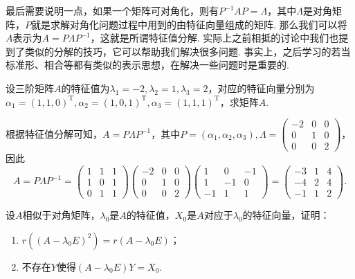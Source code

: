 最后需要说明一点，如果一个矩阵可对角化，则有$P^{-1}AP=\varLambda$，其中$\varLambda$是对角矩阵，$P$就是求解对角化问题过程中用到的由特征向量组成的矩阵. 那么我们可以将$A$表示为$A=P\varLambda P^{-1}$，这就是所谓特征值分解. 实际上之前相抵的讨论中我们也提到了类似的分解的技巧，它可以帮助我们解决很多问题. 事实上，之后学习的若当标准形、相合等都有类似的表示思想，在解决一些问题时是重要的.
\begin{example}{}{}
    设三阶矩阵$A$的特征值为$\lambda_1=-2,\lambda_2=1,\lambda_3=2$，对应的特征向量分别为$\alpha_1=(1,1,0)^\mathrm{T},\alpha_2=(1,0,1)^\mathrm{T},\alpha_3=(1,1,1)^\mathrm{T}$，求矩阵$A$.
\end{example}

\begin{solution}
    根据特征值分解可知，$A=P\varLambda P^{-1}$，其中$P=(\alpha_1,\alpha_2,\alpha_3),\varLambda=\begin{pmatrix}
            -2 & 0 & 0 \\
            0  & 1 & 0 \\
            0  & 0 & 2
        \end{pmatrix}$，因此
    \[A=P\varLambda P^{-1}=\begin{pmatrix}
            1 & 1 & 1 \\
            1 & 0 & 1 \\
            0 & 1 & 1
        \end{pmatrix}\begin{pmatrix}
            -2 & 0 & 0 \\
            0  & 1 & 0 \\
            0  & 0 & 2
        \end{pmatrix}\begin{pmatrix}
            1  & 0  & -1 \\
            1  & -1 & 0  \\
            -1 & 1  & 1
        \end{pmatrix}=\begin{pmatrix}
            -3 & 1 & 4 \\
            -4 & 2 & 4 \\
            -1 & 1 & 2
        \end{pmatrix}.\]
\end{solution}

\begin{example}{}{}
    设$A$相似于对角矩阵，$\lambda_0$是$A$的特征值，$X_0$是$A$对应于$\lambda_0$的特征向量，证明：
    \begin{enumerate}
        \item $r((A-\lambda_0 E)^2)=r(A-\lambda_0 E)$；

        \item 不存在$Y$使得$(A-\lambda_0 E)Y=X_0$.
    \end{enumerate}
\end{example}

